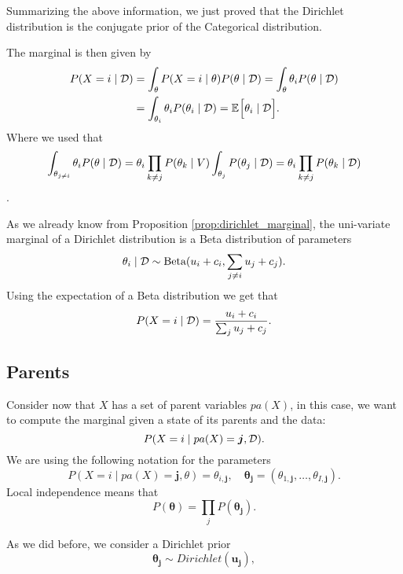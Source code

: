 \begin{remark}
Summarizing the above information, we just proved that the Dirichlet distribution is the conjugate prior of the Categorical distribution.
\end{remark}

The marginal is then given by
\[
  \begin{aligned}
    P(X=i \mid \mathcal{D}) &= \int_{\theta}P(X=i \mid \theta)P(\theta \mid \mathcal{D}) =  \int_{\theta}\theta_{i}P(\theta \mid \mathcal{D})\\
    &=  \int_{\theta_{i}}\theta_{i}P(\theta_{i} \mid \mathcal{D}) = \mathbb{E}_{}\Big[\theta_{i} \mid \mathcal{D}\Big].
\end{aligned}
\]
Where we used that
\[\int_{\theta_{j \neq i}}\theta_{i} P(\theta \mid \mathcal{D}) = \theta_{i}\prod_{k\neq j}P(\theta_{k} \mid V) \int_{\theta_{j}}P(\theta_{j}\mid \mathcal{D}) = \theta_{i} \prod_{k \neq j}P(\theta_{k} \mid \mathcal{D})\].

As we already know from Proposition \ref{prop:dirichlet_marginal}, the uni-variate marginal of a Dirichlet distribution is a
Beta distribution of parameters
\[
  \theta_{i} \mid \mathcal{D} \sim \text{Beta}(u_{i} + c_{i}, \sum_{j\neq i} u_{j} + c_{j}).
\]
Using the expectation of a Beta distribution we get that
\[
  P(X = i \mid \mathcal{D}) = \frac{u_{i} + c_{i}}{\sum_{j}u_{j} + c_{j}}.
\]

\subsection{Parents}
Consider now that \(X\) has a set of parent variables \(pa(X)\), in this case,
we want to compute the marginal given a state of its parents and the data:
\[
  P(X = i \mid pa(X) = \bm{j}, \mathcal{D}).
\]
We are using the following notation for the parameters
\[
  P(X = i \mid pa(X) = \bm{j}, \theta) = \theta_{i,\bm{j}}, \quad \bm{\theta_{j}} = (\theta_{1,\bm{j}},\dots, \theta_{I,\bm{j}}).
\]
Local independence means that
\[
  P(\bm{\theta}) = \prod_{j}P(\bm{\theta_{j}}).
\]

As we did before, we consider a Dirichlet prior
\[
  \bm{\theta_{j}} \sim Dirichlet(\bm{u_{j}}),
\]


